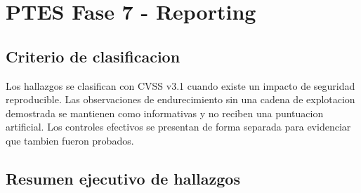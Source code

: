\chapter{PTES Fase 7 - Reporting}

\section{Criterio de clasificacion}

Los hallazgos se clasifican con CVSS v3.1 cuando existe un impacto de
seguridad reproducible. Las observaciones de endurecimiento sin una cadena de
explotacion demostrada se mantienen como informativas y no reciben una
puntuacion artificial. Los controles efectivos se presentan de forma
separada para evidenciar que tambien fueron probados.

\section{Resumen ejecutivo de hallazgos}

